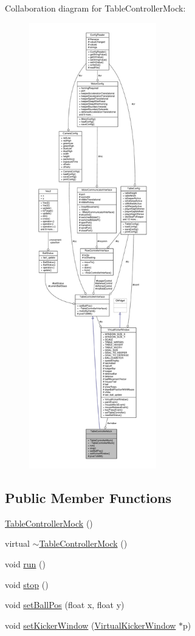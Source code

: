 Collaboration diagram for Table\+Controller\+Mock\+:\nopagebreak
\begin{figure}[H]
\begin{center}
\leavevmode
\includegraphics[height=550pt]{class_table_controller_mock__coll__graph}
\end{center}
\end{figure}
\subsection*{Public Member Functions}
\begin{DoxyCompactItemize}
\item 
\hyperlink{class_table_controller_mock_a9416ad0fab277d264d587aef84dea9a6}{Table\+Controller\+Mock} ()
\item 
virtual \hyperlink{class_table_controller_mock_aa702d9abf0a9838ec8849881cc535b6a}{$\sim$\+Table\+Controller\+Mock} ()
\item 
void \hyperlink{class_table_controller_mock_a8bcca861a6459db724e544f3bcd7c1fd}{run} ()
\item 
void \hyperlink{class_table_controller_mock_a616270aef92ad4e78f90ca4c10ff0ef0}{stop} ()
\item 
void \hyperlink{class_table_controller_mock_abdfceff1485c7ad42a5d34159a27d796}{set\+Ball\+Pos} (float x, float y)
\item 
void \hyperlink{class_table_controller_mock_a4ca15421d6fe242682de756a01af719c}{set\+Kicker\+Window} (\hyperlink{class_virtual_kicker_window}{Virtual\+Kicker\+Window} $\ast$p)
\end{DoxyCompactItemize}
